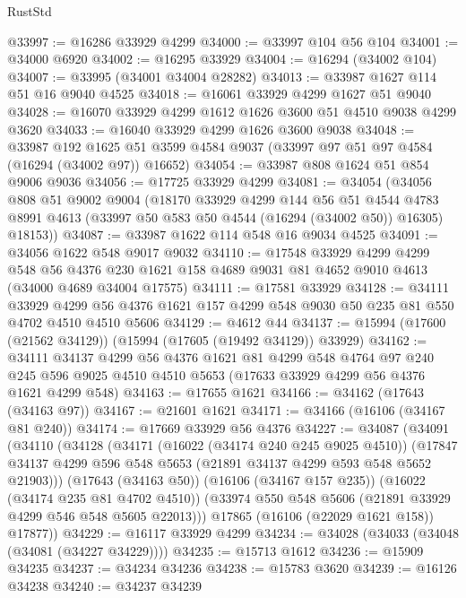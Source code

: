 \begin{lexlean}{RustStd}
\begin{coremodule}
@33997 := @16286 @33929 @4299
@34000 := @33997 @104 @56 @104
@34001 := @34000 @6920
@34002 := @16295 @33929
@34004 := @16294 (@34002 @104)
@34007 := @33995 (@34001 @34004 @28282)
@34013 := @33987 @1627 @114 @51 @16 @9040 @4525
@34018 := @16061 @33929 @4299 @1627 @51 @9040
@34028 := @16070 @33929 @4299 @1612 @1626 @3600 @51 @4510 @9038 @4299 @3620
@34033 := @16040 @33929 @4299 @1626 @3600 @9038
@34048 := @33987
    @192
    @1625
    @51
    @3599
    @4584
    @9037
    (@33997 @97 @51 @97 @4584 (@16294 (@34002 @97)) @16652)
@34054 := @33987 @808 @1624 @51 @854 @9006 @9036
@34056 := @17725 @33929 @4299
@34081 := @34054
    (@34056
      @808
      @51
      @9002
      @9004
      (@18170
        @33929
        @4299
        @144
        @56
        @51
        @4544
        @4783
        @8991
        @4613
        (@33997 @50 @583 @50 @4544 (@16294 (@34002 @50)) @16305)
        @18153))
@34087 := @33987 @1622 @114 @548 @16 @9034 @4525
@34091 := @34056 @1622 @548 @9017 @9032
@34110 := @17548
    @33929
    @4299
    @4299
    @548
    @56
    @4376
    @230
    @1621
    @158
    @4689
    @9031
    @81
    @4652
    @9010
    @4613
    (@34000 @4689 @34004 @17575)
@34111 := @17581 @33929
@34128 := @34111
    @33929
    @4299
    @56
    @4376
    @1621
    @157
    @4299
    @548
    @9030
    @50
    @235
    @81
    @550
    @4702
    @4510
    @4510
    @5606
@34129 := @4612 @44
@34137 := @15994 (@17600 (@21562 @34129)) (@15994 (@17605 (@19492 @34129)) @33929)
@34162 := @34111
    @34137
    @4299
    @56
    @4376
    @1621
    @81
    @4299
    @548
    @4764
    @97
    @240
    @245
    @596
    @9025
    @4510
    @4510
    @5653
    (@17633 @33929 @4299 @56 @4376 @1621 @4299 @548)
@34163 := @17655 @1621
@34166 := @34162 (@17643 (@34163 @97))
@34167 := @21601 @1621
@34171 := @34166 (@16106 (@34167 @81 @240))
@34174 := @17669 @33929 @56 @4376
@34227 := @34087
    (@34091
      (@34110
        (@34128
          (@34171
            (@16022 (@34174 @240 @245 @9025 @4510))
            (@17847 @34137 @4299 @596 @548 @5653 (@21891 @34137 @4299 @593 @548 @5652 @21903)))
          (@17643 (@34163 @50))
          (@16106 (@34167 @157 @235))
          (@16022 (@34174 @235 @81 @4702 @4510))
          (@33974 @550 @548 @5606 (@21891 @33929 @4299 @546 @548 @5605 @22013)))
        @17865
        (@16106 (@22029 @1621 @158))
        @17877))
@34229 := @16117 @33929 @4299
@34234 := @34028 (@34033 (@34048 (@34081 (@34227 @34229))))
@34235 := @15713 @1612
@34236 := @15909 @34235
@34237 := @34234 @34236
@34238 := @15783 @3620
@34239 := @16126 @34238
@34240 := @34237 @34239

\end{coremodule}
\end{lexlean}
